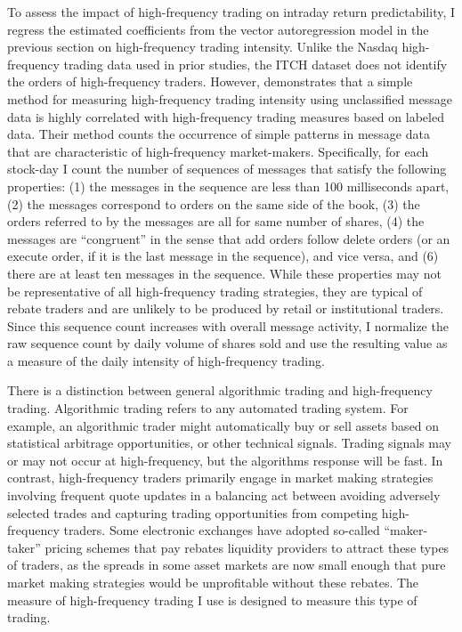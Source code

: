	To assess the impact of high-frequency trading on intraday return predictability, I regress the estimated coefficients from the vector autoregression model in the previous section on high-frequency trading intensity. Unlike the Nasdaq high-frequency trading data used in prior studies, the ITCH dataset does not identify the orders of high-frequency traders. However, \citet{Hasbrouck2013} demonstrates that a simple method for measuring high-frequency trading intensity using unclassified message data is highly correlated with high-frequency trading measures based on labeled data. Their method counts the occurrence of simple patterns in message data that are characteristic of high-frequency market-makers. Specifically, for each stock-day I count the number of sequences of messages that satisfy the following properties: (1) the messages in the sequence are less than 100 milliseconds apart, (2) the messages correspond to orders on the same side of the book, (3) the orders referred to by the messages are all for same number of shares, (4) the messages are ``congruent'' in the sense that add orders follow delete orders (or an execute order, if it is the last message in the sequence), and vice versa, and (6) there are at least ten messages in the sequence. While these properties may not be representative of all high-frequency trading strategies, they are typical of rebate traders and are unlikely to be produced by retail or institutional traders. Since this sequence count increases with overall message activity, I normalize the raw sequence count by daily volume of shares sold and use the resulting value as a measure of the daily intensity of high-frequency trading.

	There is a distinction between general algorithmic trading and high-frequency trading. Algorithmic trading refers to any automated trading system. For example, an algorithmic trader might automatically buy or sell assets based on statistical arbitrage opportunities, or other technical signals. Trading signals may or may not occur at high-frequency, but the algorithms response will be fast. In contrast, high-frequency traders primarily engage in market making strategies involving frequent quote updates in a balancing act between avoiding adversely selected trades and capturing trading opportunities from competing high-frequency traders. Some electronic exchanges have adopted so-called ``maker-taker'' pricing schemes that pay rebates liquidity providers to attract these types of traders, as the spreads in some asset markets are now small enough that pure market making strategies would be unprofitable without these rebates. The measure of high-frequency trading I use is designed to measure this type of trading.

